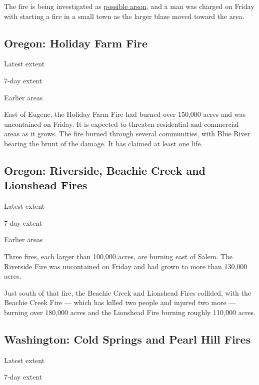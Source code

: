 The fire is being investigated as
\href{https://www.nytimes3xbfgragh.onion/2020/09/12/us/wildfires-live-updates.html\#link-18416023}{possible
arson}, and a man was charged on Friday with starting a fire in a small
town as the larger blaze moved toward the area.

\hypertarget{oregon-holiday-farm-fire}{%
\subsection{Oregon: Holiday Farm Fire}\label{oregon-holiday-farm-fire}}

Latest extent

7-day extent

Earlier areas

East of Eugene, the Holiday Farm Fire had burned over 150,000 acres and
was uncontained on Friday. It is expected to threaten residential and
commercial areas as it grows. The fire burned through several
communities, with Blue River bearing the brunt of the damage. It has
claimed at least one life.

\hypertarget{oregon-riverside-beachie-creek-and-lionshead-fires}{%
\subsection{Oregon: Riverside, Beachie Creek and Lionshead
Fires}\label{oregon-riverside-beachie-creek-and-lionshead-fires}}

Latest extent

7-day extent

Earlier areas

Three fires, each larger than 100,000 acres, are burning east of Salem.
The Riverside Fire was uncontained on Friday and had grown to more than
130,000 acres.

Just south of that fire, the Beachie Creek and Lionshead Fires collided,
with the Beachie Creek Fire --- which has killed two people and injured
two more --- burning over 180,000 acres and the Lionshead Fire burning
roughly 110,000 acres.

\hypertarget{washington-cold-springs-and-pearl-hill-fires}{%
\subsection{Washington: Cold Springs and Pearl Hill
Fires}\label{washington-cold-springs-and-pearl-hill-fires}}

Latest extent

7-day extent

